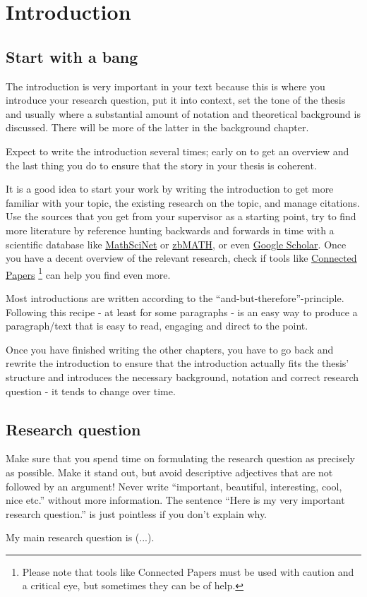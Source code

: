 \chapter{Introduction}

\section{Start with a bang}
The introduction is very important in your text because this is where you introduce your research question, put it into context, set the tone of the thesis and usually where a substantial amount of notation and theoretical background is discussed. There will be more of the latter in the background chapter.

Expect to write the introduction several times; early on to get an overview and the last thing you do to ensure that the story in your thesis is coherent.

It is a good idea to start your work by writing the introduction to get more familiar with your topic, the existing research on the topic, and manage citations. Use the sources that you get from your supervisor as a starting point, try to find more literature by reference hunting backwards and forwards in time with a scientific database like \hyperlink{https://mathscinet.ams.org/}{MathSciNet} or \hyperlink{https://zbmath.org/}{zbMATH}, or even \hyperlink{https://scholar.google.com/}{Google Scholar}. Once you have a decent overview of the relevant research, check if tools like \hyperlink{https://www.connectedpapers.com/}{Connected Papers} \footnote{Please note that tools like Connected Papers must be used with caution and a critical eye, but sometimes they can be of help.} can help you find even more.

Most introductions are written according to the \enquote{and-but-therefore}-principle. Following this recipe - at least for some paragraphs - is an easy way to produce a paragraph/text that is easy to read, engaging and direct to the point.

Once you have finished writing the other chapters, you have to go back and rewrite the introduction to ensure that the introduction actually fits the thesis' structure and introduces the necessary background, notation and correct research question - it tends to change over time.

\section{Research question}
Make sure that you spend time on formulating the research question as precisely as possible. Make it stand out, but avoid descriptive adjectives that are not followed by an argument! Never write \enquote{important, beautiful, interesting, cool, nice etc.} without more information. The sentence \enquote{Here is my very important research question.} is just pointless if you don't explain why.
\begin{question}
    My main research question is (...). 
\end{question}

